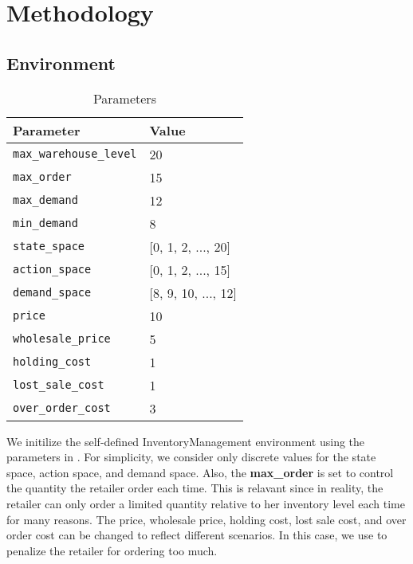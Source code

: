 \section{Methodology}
\subsection{Environment}
\begin{table}[H]
    \centering
    \begin{tabular}{|l|l|}
        \hline
        \textbf{Parameter}             & \textbf{Value}      \\
        \hline
        \texttt{max\_warehouse\_level} & 20                  \\
        \texttt{max\_order}            & 15                  \\
        \texttt{max\_demand}           & 12                  \\
        \texttt{min\_demand}           & 8                   \\
        \texttt{state\_space}          & [0, 1, 2, ..., 20]  \\
        \texttt{action\_space}         & [0, 1, 2, ..., 15]  \\
        \texttt{demand\_space}         & [8, 9, 10, ..., 12] \\
        \texttt{price}                 & 10                  \\
        \texttt{wholesale\_price}      & 5                   \\
        \texttt{holding\_cost}         & 1                   \\
        \texttt{lost\_sale\_cost}      & 1                   \\
        \texttt{over\_order\_cost}     & 3                   \\
        \hline
    \end{tabular}
    \caption{Parameters}
    \label{tab:pars}
\end{table}
We initilize the self-defined InventoryManagement environment using the parameters in . For simplicity, we consider only discrete values for the state space, action space, and demand space. Also, the \textbf{max\_order} is set to control the quantity the retailer order each time. This is relavant since in reality, the retailer can only order a limited quantity relative to her inventory level each time for many reasons. The price, wholesale price, holding cost, lost sale cost, and over order cost can be changed to reflect different scenarios. In this case, we use  to penalize the retailer for ordering too much.


